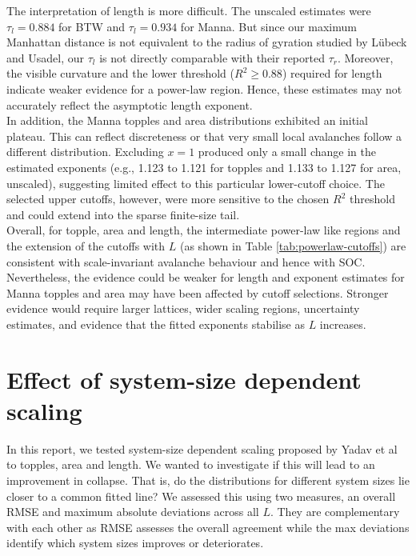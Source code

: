 The interpretation of length is more difficult. The unscaled estimates were $\tau_l=0.884$ for BTW and $\tau_l=0.934$ for Manna. But since our maximum Manhattan distance is not equivalent to the radius of gyration studied by L\"{u}beck and Usadel, our $\tau_l$ is not directly comparable with their reported $\tau_r$. Moreover, the visible curvature and the lower threshold ($R^2 \geq 0.88$) required for length indicate weaker evidence for a power-law region. Hence, these estimates may not accurately reflect the asymptotic length exponent.\\

In addition, the Manna topples and area distributions exhibited an initial plateau. This can reflect discreteness or that very small local avalanches follow a different distribution. Excluding $x=1$ produced only a small change in the estimated exponents (e.g., 1.123 to 1.121 for topples and 1.133 to 1.127 for area, unscaled), suggesting limited effect to this particular lower-cutoff choice. The selected upper cutoffs, however, were more sensitive to the chosen $R^2$ threshold and could extend into the sparse finite-size tail. \\

Overall, for topple, area and length, the intermediate power-law like regions and the extension of the cutoffs with $L$ (as shown in Table \ref{tab:powerlaw-cutoffs}) are consistent with scale-invariant avalanche behaviour and hence with SOC. Nevertheless, the evidence could be weaker for length and exponent estimates for Manna topples and area may have been affected by cutoff selections. Stronger evidence would require larger lattices, wider scaling regions, uncertainty estimates, and evidence that the fitted exponents stabilise as $L$ increases.

\section{Effect of system-size dependent scaling}\label{sec:discuss-scaling}

In this report, we tested system-size dependent scaling proposed by Yadav et al \cite{Yadav2022FiniteSize} to topples, area and length. We wanted to investigate if this will lead to an improvement in collapse. That is, do the distributions for different system sizes lie closer to a common fitted line? We assessed this using two measures, an overall RMSE and maximum absolute deviations across all $L$. They are complementary with each other as RMSE assesses the overall agreement while the max deviations identify which system sizes improves or deteriorates.\\ 

